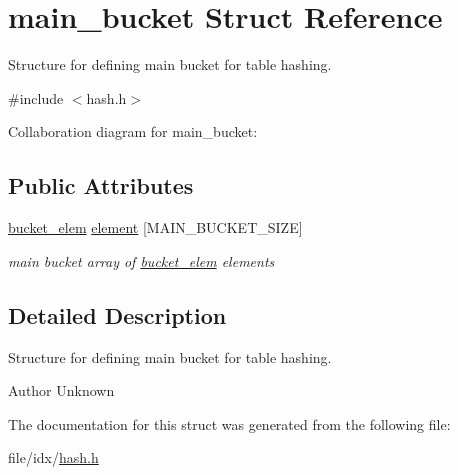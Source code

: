 \hypertarget{structmain__bucket}{}\section{main\+\_\+bucket Struct Reference}
\label{structmain__bucket}


Structure for defining main bucket for table hashing.  




{\ttfamily \#include $<$hash.\+h$>$}



Collaboration diagram for main\+\_\+bucket\+:
\subsection*{Public Attributes}
\begin{DoxyCompactItemize}
\item 
\hyperlink{structbucket__elem}{bucket\+\_\+elem} \hyperlink{structmain__bucket_a9b8d4d8df358bb72c94902a6536a44aa}{element} \mbox{[}M\+A\+I\+N\+\_\+\+B\+U\+C\+K\+E\+T\+\_\+\+S\+I\+ZE\mbox{]}\hypertarget{structmain__bucket_a9b8d4d8df358bb72c94902a6536a44aa}{}\label{structmain__bucket_a9b8d4d8df358bb72c94902a6536a44aa}

\begin{DoxyCompactList}\small\item\em main bucket array of \hyperlink{structbucket__elem}{bucket\+\_\+elem} elements \end{DoxyCompactList}\end{DoxyCompactItemize}


\subsection{Detailed Description}
Structure for defining main bucket for table hashing. 

\begin{DoxyAuthor}{Author}
Unknown 
\end{DoxyAuthor}


The documentation for this struct was generated from the following file\+:\begin{DoxyCompactItemize}
\item 
file/idx/\hyperlink{hash_8h}{hash.\+h}\end{DoxyCompactItemize}
